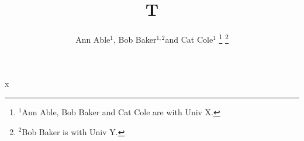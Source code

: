\documentclass{article}
\begin{document}
\title{T}
\author{Ann Able$^{1}$, Bob Baker$^{1,2}$and Cat Cole$^{1}$%
\thanks{$^{1}$Ann Able, Bob Baker and Cat Cole are with Univ X.}%
\thanks{$^{2}$Bob Baker is with Univ Y.}}
\maketitle
x
\end{document}
